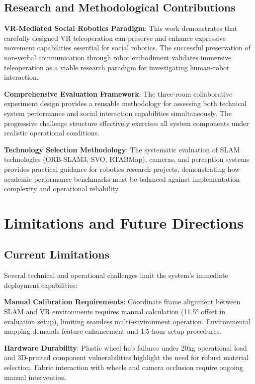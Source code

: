 \subsection{Research and Methodological Contributions}

\textbf{VR-Mediated Social Robotics Paradigm}: This work demonstrates that carefully designed VR teleoperation can preserve and enhance expressive movement capabilities essential for social robotics. The successful preservation of non-verbal communication through robot embodiment validates immersive teleoperation as a viable research paradigm for investigating human-robot interaction.

\textbf{Comprehensive Evaluation Framework}: The three-room collaborative experiment design provides a reusable methodology for assessing both technical system performance and social interaction capabilities simultaneously. The progressive challenge structure effectively exercises all system components under realistic operational conditions.

\textbf{Technology Selection Methodology}: The systematic evaluation of SLAM technologies (ORB-SLAM3, SVO, RTABMap), cameras, and perception systems provides practical guidance for robotics research projects, demonstrating how academic performance benchmarks must be balanced against implementation complexity and operational reliability.

\section{Limitations and Future Directions}

\subsection{Current Limitations}

Several technical and operational challenges limit the system's immediate deployment capabilities:

\textbf{Manual Calibration Requirements}: Coordinate frame alignment between SLAM and VR environments requires manual calculation (11.5° offset in evaluation setup), limiting seamless multi-environment operation. Environmental mapping demands feature enhancement and 1.5-hour setup procedures.

\textbf{Hardware Durability}: Plastic wheel hub failures under 20kg operational load and 3D-printed component vulnerabilities highlight the need for robust material selection. Fabric interaction with wheels and camera occlusion require ongoing manual intervention.

